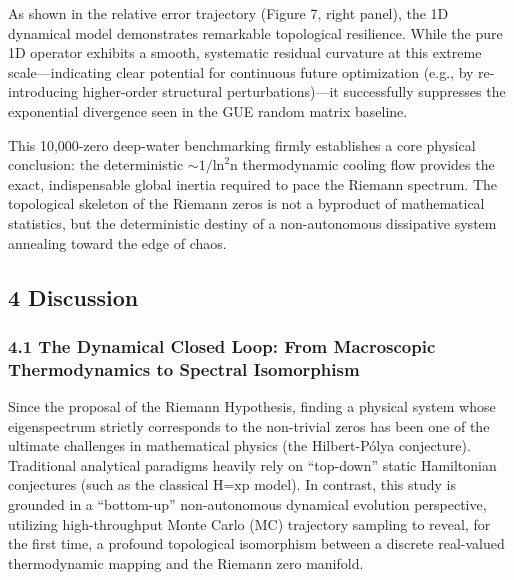 As shown in the relative error trajectory (Figure 7, right panel), the
1D dynamical model demonstrates remarkable topological resilience. While
the pure 1D operator exhibits a smooth, systematic residual curvature at
this extreme scale---indicating clear potential for continuous future
optimization (e.g., by re-introducing higher-order structural
perturbations)---it successfully suppresses the exponential divergence
seen in the GUE random matrix baseline.

This 10,000-zero deep-water benchmarking firmly establishes a core
physical conclusion: the deterministic
\(\text{∼1/}\text{ln}^{\text{2}}\text{n}\) thermodynamic cooling flow
provides the exact, indispensable global inertia required to pace the
Riemann spectrum. The topological skeleton of the Riemann zeros is not a
byproduct of mathematical statistics, but the deterministic destiny of a
non-autonomous dissipative system annealing toward the edge of chaos.

\hypertarget{discussion}{%
\subsection{\texorpdfstring{\textbf{4
Discussion}}{4 Discussion}}\label{discussion}}

\hypertarget{the-dynamical-closed-loop-from-macroscopic-thermodynamics-to-spectral-isomorphism}{%
\subsubsection{\texorpdfstring{\textbf{4.1 The Dynamical Closed Loop:
From Macroscopic Thermodynamics to Spectral
Isomorphism}}{4.1 The Dynamical Closed Loop: From Macroscopic Thermodynamics to Spectral Isomorphism}}\label{the-dynamical-closed-loop-from-macroscopic-thermodynamics-to-spectral-isomorphism}}

Since the proposal of the Riemann Hypothesis, finding a physical system
whose eigenspectrum strictly corresponds to the non-trivial zeros has
been one of the ultimate challenges in mathematical physics (the
Hilbert-Pólya conjecture). Traditional analytical paradigms heavily rely
on ``top-down'' static Hamiltonian conjectures (such as the classical
\(\text{H}\text{=}\text{xp}\) model). In contrast, this study is
grounded in a ``bottom-up'' non-autonomous dynamical evolution
perspective, utilizing high-throughput Monte Carlo (MC) trajectory
sampling to reveal, for the first time, a profound topological
isomorphism between a discrete real-valued thermodynamic mapping and the
Riemann zero manifold.

